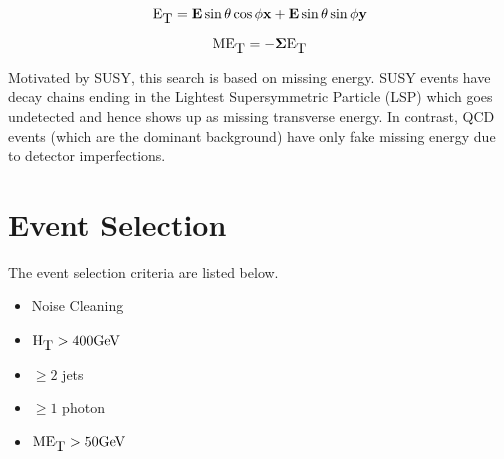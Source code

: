 \begin{equation}
\bf{\mbox{E}_{\mbox{T}}} = E\sin{\theta}\cos{\phi}\bf{x} + E\sin{\theta}\sin{\phi}\bf{y}
\label{eq:et}
\end{equation}

\begin{equation}
\bf{\mbox{ME}_{\mbox{T}}} = - \Sigma \bf{\mbox{E}_{\mbox{T}}}
\label{eq:met}
\end{equation}

Motivated by SUSY, this search is based on missing energy. SUSY events have 
decay chains ending in the Lightest Supersymmetric Particle (LSP) which goes
undetected and hence shows up as missing transverse energy. In contrast, QCD 
events (which are the dominant background) have only fake missing energy due to
detector imperfections. \\

\section{Event Selection}

The event selection criteria are listed below. 

\begin{itemize}
\item Noise Cleaning
\item $\mbox{H}_{\mbox{T}} > 400 \mbox{GeV}$
\item $\geq 2$ jets
\item $\geq 1$ photon
\item $\mbox{ME}_{\mbox{T}} > 50 \mbox{GeV}$
\end{itemize}

